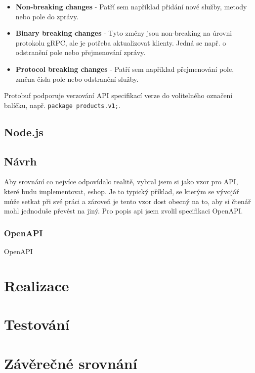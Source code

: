 \documentclass[thesis=M,czech]{FITthesis}[2019/12/23]
\begin{document}
\begin{itemize}
    \item \textbf{Non-breaking changes} - Patří sem například přidání nové služby, metody nebo pole do zprávy.
    \item \textbf{Binary breaking changes} - Tyto změny jsou non-breaking na úrovni protokolu gRPC, ale je potřeba aktualizovat klienty. Jedná se např. o odstranění pole nebo přejmenování zprávy.
    \item \textbf{Protocol breaking changes} - Patří sem například přejmenování pole, změna čísla pole nebo odstranění služby.
\end{itemize}

Protobuf podporuje verzování API specifikací verze do volitelného označení balíčku, např. \texttt{package products.v1;}. 

\section{Node.js }
\section{Návrh}
Aby srovnání co nejvíce odpovídalo realitě, vybral jsem si jako vzor pro API, které budu implementovat, eshop. Je to typický příklad, se kterým se vývojář může setkat při své práci a zároveň je tento vzor dost obecný na to, aby si čtenář mohl jednoduše převést na jiný. Pro popis api jsem zvolil specifikaci OpenAPI.

\subsection{OpenAPI}
OpenAPI 

\chapter{}

\chapter{Realizace}

\chapter{Testování}

\chapter{Závěrečné srovnání}
\end{document}
